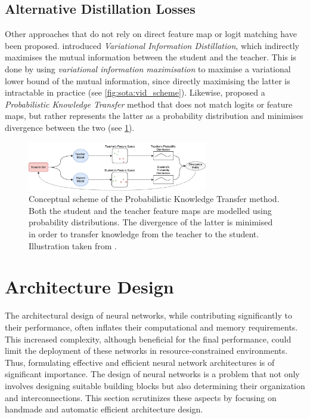 \subsection{Alternative Distillation Losses}
Other approaches that do not rely on direct feature map or logit matching have
been proposed. \cite{DBLP:conf/cvpr/AhnHDLD19} introduced \emph{Variational
  Information Distillation}, which indirectly maximises the mutual information
between the student and the teacher. This is done by using \emph{variational
  information maximisation} \cite{barber2004algorithm} to maximise a variational
lower bound of the mutual information, since directly maximising the latter is
intractable in practice (see \cref{fig:sota:vid_scheme}). Likewise,
\cite{DBLP:conf/eccv/PassalisT18} proposed a \emph{Probabilistic Knowledge
  Transfer} method that does not match logits or feature maps, but rather
represents the latter as a probability distribution and minimises divergence
between the two (see \cref{fig:sota:pkt_scheme}).\\


\begin{figure}[htbp]
  \centering
  \includegraphics[width=0.7\textwidth]{chapter_sota/assets/pkt_diagram.pdf}
  \caption{Conceptual scheme of the
    Probabilistic Knowledge Transfer method. Both the student and the teacher
    feature maps are modelled using probability distributions. The divergence of the
    latter is minimised in order to transfer knowledge from the teacher to the
    student. Illustration taken from \cite{DBLP:conf/eccv/PassalisT18}.}
  \label{fig:sota:pkt_scheme}
\end{figure}

\section{Architecture Design}\label{sec:sota:archi_design}

The architectural design of neural networks, while contributing significantly to
their performance, often inflates their computational and memory requirements.
This increased complexity, although beneficial for the final performance, could
limit the deployment of these networks in resource-constrained environments.
Thus, formulating effective and efficient neural network architectures is of
significant importance. The design of neural networks is a problem that not only
involves designing suitable building blocks but also determining their
organization and interconnections. This section scrutinizes these aspects by
focusing on handmade and automatic efficient architecture design.\\

